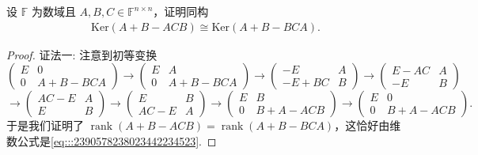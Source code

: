 \documentclass[../../main.tex]{subfiles}%
\begin{document}
\begin{example}
设 $\mathbb{F}$ 为数域且 $A,B,C \in \mathbb{F}^{n \times n}$，证明同构
\begin{align}
\mathrm{Ker}(A + B - ACB) \cong \mathrm{Ker} (A + B - BCA). \label{eq:::2390578238023442234523}
\end{align}
\end{example}
\begin{proof}

{\color{blue}证法一:}
注意到初等变换
\[
\begin{pmatrix}
E & 0 \\
0 & A + B - BCA
\end{pmatrix} \to \begin{pmatrix}
E & A \\
0 & A + B - BCA
\end{pmatrix} \to \begin{pmatrix}
-E & A \\
-E + BC & B
\end{pmatrix} \to \begin{pmatrix}
E - AC & A \\
-E & B
\end{pmatrix}
\]
\[
\to \begin{pmatrix}
AC - E & A \\
E & B
\end{pmatrix} \to \begin{pmatrix}
E & B \\
AC - E & A
\end{pmatrix} \to \begin{pmatrix}
E & B \\
0 & B + A - ACB
\end{pmatrix} \to \begin{pmatrix}
E & 0 \\
0 & B + A - ACB
\end{pmatrix}.
\]
于是我们证明了 $\operatorname{rank}(A + B - ACB) = \operatorname{rank}(A + B - BCA)$，这恰好由维数公式是\eqref{eq:::2390578238023442234523}.


\end{proof}
\end{document}
